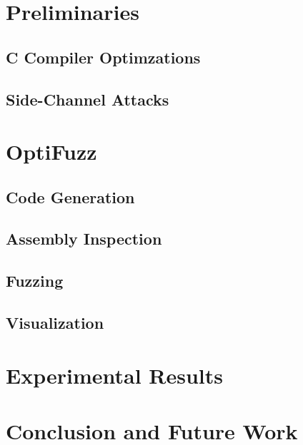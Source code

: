 \documentclass{article}
\begin{document}
\section{Preliminaries}
\subsection{C Compiler Optimzations}
\subsection{Side-Channel Attacks}

\section{OptiFuzz}
\subsection{Code Generation}
\subsection{Assembly Inspection}
\subsection{Fuzzing}
\subsection{Visualization}

\section{Experimental Results}

\section{Conclusion and Future Work}
\end{document}
